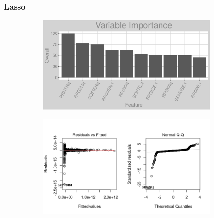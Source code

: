 \subsubsection{Lasso}
\label{appendix:electricity:l}
\begin{figure}[h]
\centering
\begin{subfigure}{1\textwidth}
\centering
\includegraphics[width=.99\textwidth, height=0.3\textheight]{Images/electricity_l_vars.png}
\end{subfigure}
\begin{subfigure}{1\textwidth}
\centering
\includegraphics[width=.99\textwidth, height=0.475\textheight]{Images/electricity_l_res_1.png}
\end{subfigure}
\end{figure}
\newpage
